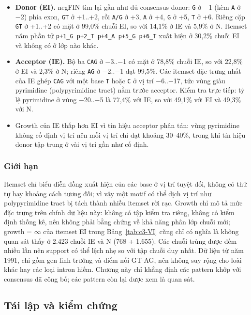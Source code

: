 \begin{itemize}
\tightlist
\item
  \textbf{Donor (EI).} negFIN tìm lại gần như đủ consensus donor: \texttt{G} ở −1 (kèm \texttt{A} ở −2) phía exon, \texttt{GT} ở +1..+2, rồi \nolinkurl{A/G} ở +3, \texttt{A} ở +4, \texttt{G} ở +5, \texttt{T} ở +6. Riêng cặp \texttt{GT} ở +1..+2 có mặt ở 99,0\% chuỗi EI, so với 14,1\% ở IE và 5,9\% ở N. Itemset năm phần tử \texttt{p+1\_G\ p+2\_T\ p+4\_A\ p+5\_G\ p+6\_T} xuất hiện ở 30,2\% chuỗi EI và không có ở lớp nào khác.
\item
  \textbf{Acceptor (IE).} Bộ ba \texttt{CAG} ở −3..−1 có mặt ở 78,8\% chuỗi IE, so với 22,8\% ở EI và 2,3\% ở N; riêng \texttt{AG} ở −2..−1 đạt 99,5\%. Các itemset đặc trưng nhất của IE ghép \texttt{CAG} với một base \texttt{T} hoặc \texttt{C} ở vị trí −6..−17, tức vùng giàu pyrimidine (polypyrimidine tract) nằm trước acceptor. Kiểm tra trực tiếp: tỷ lệ pyrimidine ở vùng −20..−5 là 77,4\% với IE, so với 49,1\% với EI và 49,3\% với N.
\item
  Growth của IE thấp hơn EI vì tín hiệu acceptor phân tán: vùng pyrimidine không cố định vị trí nên mỗi vị trí chỉ đạt khoảng 30--40\%, trong khi tín hiệu donor tập trung ở vài vị trí gần như cố định.
\end{itemize}

\subsubsection{Giới hạn}

Itemset chỉ biểu diễn đồng xuất hiện của các base ở vị trí tuyệt đối, không có thứ tự hay khoảng cách tương đối; vì vậy một motif có thể dịch vị trí như polypyrimidine tract bị tách thành nhiều itemset rời rạc. Growth chỉ mô tả mức đặc trưng trên chính dữ liệu này: không có tập kiểm tra riêng, không có kiểm định thống kê, nên không phải bằng chứng về khả năng phân lớp chuỗi mới; growth = $\infty$ của itemset EI trong Bảng~\ref{tab:c3-VI} cũng chỉ có nghĩa là không quan sát thấy ở 2.423 chuỗi IE và N (768 + 1.655). Các chuỗi trùng được đếm nhiều lần nên support có thể lệch nhẹ so với tập chuỗi duy nhất. Dữ liệu từ năm 1991, chỉ gồm gen linh trưởng và điểm nối GT-AG, nên không suy rộng cho loài khác hay các loại intron hiếm. Chương này chỉ khẳng định các pattern khớp với consensus đã công bố; các pattern còn lại được xem là quan sát.

\subsection{Tái lập và kiểm chứng}


